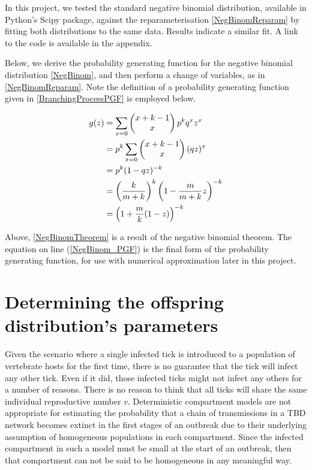\documentclass{article}
\begin{document}
In this project, we tested the standard negative binomial distribution, available in Python's Scipy package, against the reparameterisation \eqref{NegBinomReparam} by fitting both distributions to the same data. Results indicate a similar fit. A link to the code is available in the appendix.

Below, we derive the probability generating function for the negative binomial distribution \eqref{NegBinom}, and then perform a change of variables, as in \eqref{NegBinomReparam}. Note the definition of a probability generating function given in \eqref{BranchingProcessPGF} is employed below.

\begin{align}
	g(z) &= \sum_{x=0} \left(\begin{matrix}x+k-1 \\ x  \end{matrix}\right) \space p^k q^x z^x \nonumber \\ 
	     &= p^k \sum_{x=0} \left(\begin{matrix}x+k-1 \\ x \end{matrix}\right) \space (qz)^x \nonumber \\
	     &= p^k (1-qz)^{-k} \label{NegBinomTheorem} \\
	     &= \left(\frac{k}{m+k}\right)^k \left(1-\frac{m}{m+k}z\right)^{-k} \nonumber \\ 
	     &= \left(1 + \frac{m}{k}(1-z)\right)^{-k} \label{NegBinom_PGF}
\end{align}

Above, \eqref{NegBinomTheorem} is a result of the negative binomial theorem. The equation on line (\ref{NegBinom_PGF}) is the final form of the probability generating function, for use with numerical approximation later in this project.

\newpage

\section{Determining the offspring distribution's parameters}

Given the scenario where a single infected tick is introduced to a population of vertebrate hosts for the first time, there is no guarantee that the tick will infect any other tick. Even if it did, those infected ticks might not infect any others for a number of reasons. There is no reason to think that all ticks will share the same individual reproductive number $ v $. Deterministic compartment models are not appropriate for estimating the probability that a chain of transmissions in a TBD network becomes extinct in the first stages of an outbreak due to their underlying assumption of homogeneous populations in each compartment. Since the infected compartment in such a model must be small at the start of an outbreak, then that compartment can not be said to be homogeneous in any meaningful way.
\end{document}
